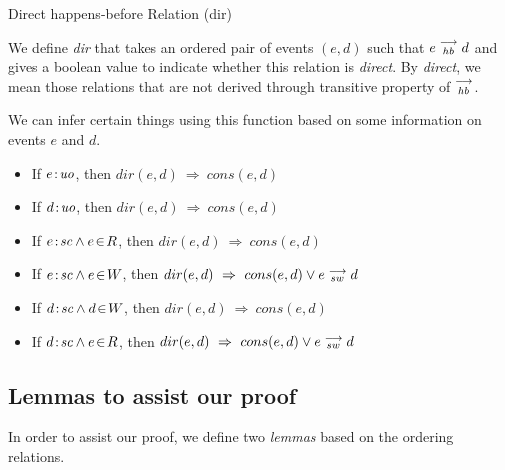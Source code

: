 \begin{definition}{Direct happens-before Relation (dir)}
    
    We define \textit{dir} that takes an ordered pair of events $(e,d)$ such that $e\stackrel{\longrightarrow}{_{hb}}d$ and gives a boolean value to indicate whether this relation is \textit{direct}. By \textit{direct}, we mean those relations that are not derived through transitive property of $\stackrel{\longrightarrow}{_{hb}}$.
    
    We can infer certain things using this function based on some information on events $e$ and $d$. 
    \begin{itemize}
        \item If $e\!:\!\textit{uo}$, then $dir(e,d) \ \Rightarrow \ cons(e,d)$
        \item If $d\!:\!\textit{uo}$, then $dir(e,d) \ \Rightarrow \ cons(e,d)$
        \item If $e\!:\!\textit{sc} \wedge e\!\in\!R$, then $dir(e,d) \ \Rightarrow \ cons(e,d)$
        \item If $e\!:\!\textit{sc} \wedge e\!\in\!W$, then $dir(e,d) \ \Rightarrow \ cons(e,d) \vee \reln{e}{sw}{d}$
        \item If $d\!:\!\textit{sc} \wedge d\!\in\!W$, then $dir(e,d) \ \Rightarrow \ cons(e,d)$
        \item If $d\!:\!\textit{sc} \wedge e\!\in\!R$, then $dir(e,d) \ \Rightarrow \ cons(e,d) \vee \reln{e}{sw}{d}$
    \end{itemize}


\end{definition}


\newcommand{\cons}[2]{\textit{cons}(#1,#2)}
  
    \subsection{Lemmas to assist our proof}    
    In order to assist our proof, we define two \textit{lemmas} based on the ordering relations. 
    
